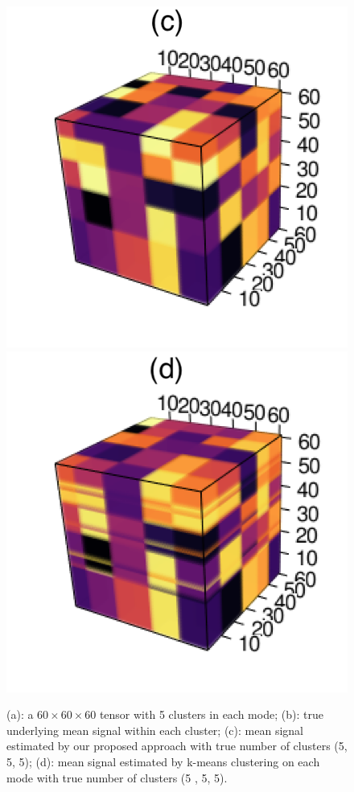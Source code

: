 \documentclass{article}
\begin{document}
\begin{figure}[!h]
	\includegraphics[scale=0.35]{figures/figure1/output.png}
	\includegraphics[scale=0.35]{figures/figure1/k_means.png}
	\caption{(a): a $60\times 60\times 60$ tensor with 5 clusters in each mode; (b): true underlying mean signal within each cluster; (c): mean signal estimated by our proposed approach with true number of clusters (5, 5, 5); (d): mean signal estimated by k-means clustering on each mode with true number of clusters (5 , 5, 5).}
	\label{fig:1}
\end{figure}
\end{document}
